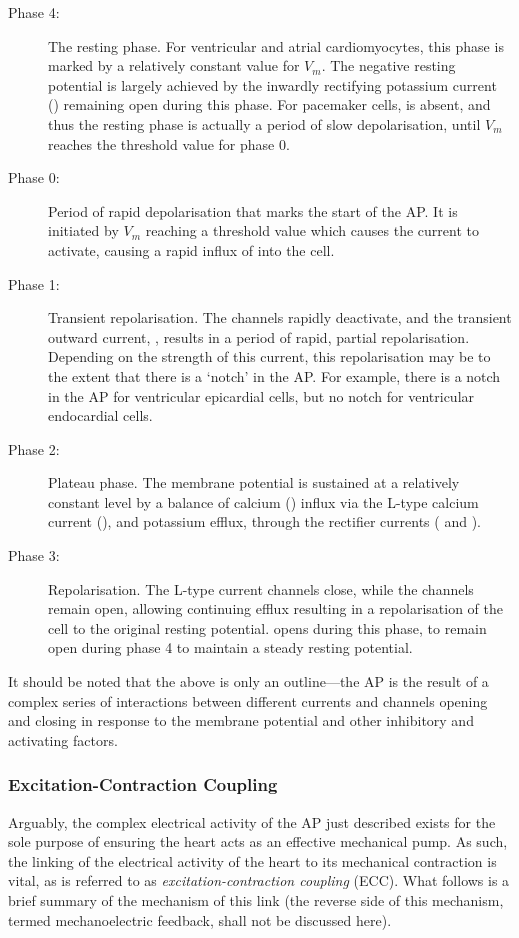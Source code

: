 \documentclass[../thesis-main.tex]{subfiles}
\begin{document}
 \begin{description}
  \item[Phase 4:] The resting phase. For ventricular and atrial cardiomyocytes, this phase is marked by a relatively constant value for $V_m$. The negative resting potential is largely achieved by the inwardly rectifying potassium current (\ikix{}) remaining open during this phase. For pacemaker cells, \ikix{} is absent, and thus the resting phase is actually a period of slow depolarisation, until $V_m$ reaches the threshold value for phase 0.
  \item[Phase 0:] Period of rapid depolarisation that marks the start of the AP. It is initiated by $V_m$ reaching a threshold value which causes the \ina{} current to activate, causing a rapid influx of \na{} into the cell.
  \item[Phase 1:] Transient repolarisation. The \na{} channels rapidly deactivate, and the transient outward current, \ito{}, results in a period of rapid, partial repolarisation. Depending on the strength of this current, this repolarisation may be to the extent that there is a `notch' in the AP. For example, there is a notch in the AP for ventricular epicardial cells, but no notch for ventricular endocardial cells.
  \item[Phase 2:] Plateau phase. The membrane potential is sustained at a relatively constant level by a balance of calcium (\ca{}) influx via the L-type calcium current (\ica{}), and potassium efflux, through the rectifier \K{} currents (\ikr{} and \iks{}).
  \item[Phase 3:] Repolarisation. The L-type \ca{} current channels close, while the \iks{} channels remain open, allowing continuing \K{} efflux resulting in a repolarisation of the cell to the original resting potential. \ikix{} opens during this phase, to remain open during phase 4 to maintain a steady resting potential. 
 \end{description}
 It should be noted that the above is only an outline---the AP is the result of a complex series of interactions between different currents and channels opening and closing in response to the membrane potential and other inhibitory and activating factors.
 
 \subsubsection{Excitation-Contraction Coupling}
 \label{subsubsec:ecc}
 Arguably, the complex electrical activity of the AP just described exists for the sole purpose of ensuring the heart acts as an effective mechanical pump. As such, the linking of the electrical activity of the heart to its mechanical contraction is vital, as is referred to as \emph{excitation-contraction coupling} (ECC). What follows is a brief summary of the mechanism of this link (the reverse side of this mechanism, termed mechanoelectric feedback, shall not be discussed here).
 
\end{document}
